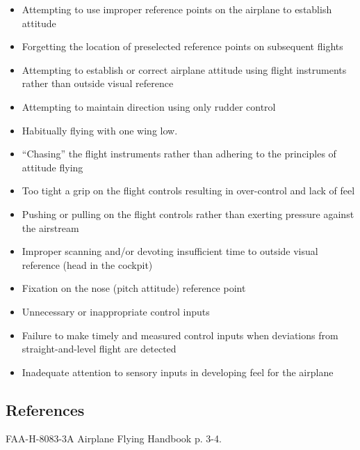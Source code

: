 \begin{itemize}
  \item Attempting to use improper reference points on the airplane to
    establish attitude
  \item Forgetting the location of preselected reference points on subsequent
    flights
  \item Attempting to establish or correct airplane attitude using flight
    instruments rather than outside visual reference
  \item Attempting to maintain direction using only rudder control
  \item Habitually flying with one wing low.
  \item ``Chasing'' the flight instruments rather than adhering to the
    principles of attitude flying
  \item Too tight a grip on the flight controls resulting in over-control and
    lack of feel
  \item Pushing or pulling on the flight controls rather than exerting pressure
    against the airstream
  \item Improper scanning and/or devoting insufficient time to outside visual
    reference (head in the cockpit)
  \item Fixation on the nose (pitch attitude) reference point
  \item Unnecessary or inappropriate control inputs
  \item Failure to make timely and measured control inputs when deviations from
    straight-and-level flight are detected
  \item Inadequate attention to sensory inputs in developing feel for the
    airplane
\end{itemize}

\subsection{References}

FAA-H-8083-3A Airplane Flying Handbook p. 3-4.

